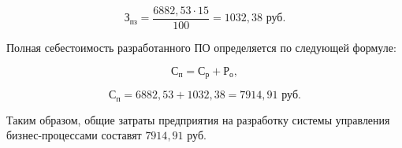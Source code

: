 \begin{equation}
  \text{З}_\text{пз} = \frac{6882,53 \cdot 15}{100} = 1032,38 \text{ руб.}
\end{equation}

Полная себестоимость разработанного ПО определяется по следующей формуле:

\begin{equation}
  \text{С}_\text{п} = \text{С}_\text{р} + \text{Р}_\text{о},
\end{equation}

\begin{equation}
  \text{С}_\text{п} = 6882,53 + 1032,38 = 7914,91 \text{ руб.}
\end{equation}

Таким образом, общие затраты предприятия на разработку системы управления бизнес-процессами составят $7914,91$ руб.
